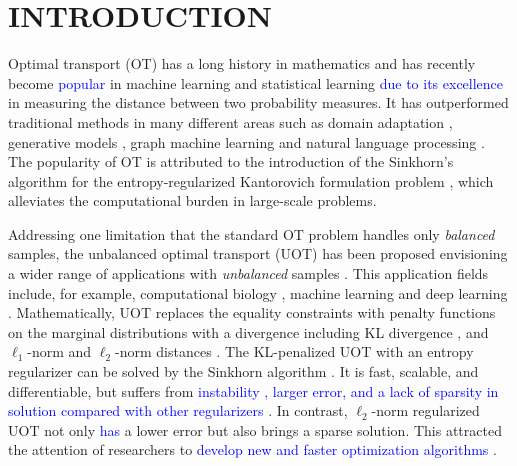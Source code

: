 \documentclass[twoside]{article}
\theoremstyle{plain}
\newcommand{\changeXS}[1]{\textcolor{blue}{#1}}
\begin{document}
\section{INTRODUCTION}
\label{sec:int}
Optimal transport (OT) has a long history in mathematics and has recently become \changeXS{popular} in machine learning and statistical learning \changeXS{due to its excellence }in measuring the distance between two probability measures. It has outperformed traditional methods in many different areas such as domain adaptation \citep{Courty_PAMI_2017}, generative models \citep{arjovsky2017wasserstein}, graph machine learning \citep{Maretic_NIPS_2019} and natural language processing \citep{Chen_ICLR_2019}. The popularity of OT is attributed to the introduction of the Sinkhorn's algorithm \citep{Sinkhorn_1974} for the entropy-regularized Kantorovich formulation problem \citep{Cuturi_NIPS_2013}, which alleviates the computational burden in large-scale problems.

Addressing one limitation that the standard OT problem handles only {\it balanced} samples, the unbalanced optimal transport (UOT) has been proposed envisioning a wider range of applications with {\it unbalanced} samples \citep{Caffarelli_AM_2010,chizat2017scaling}. This application fields include, for example, computational biology \citep{Schiebinger_CELL_2019}, machine learning \citep{Janati_AISTATS_2019} and deep learning \citep{Yang_ICLR_2019}. Mathematically, UOT replaces the equality constraints with penalty functions on the marginal distributions with a divergence including KL divergence \citep{Liero:2018wo}, and $\ell_1$-norm \citep{Caffarelli_AM_2010} and $\ell_2$-norm distances \citep{refId0}. The KL-penalized UOT with an entropy regularizer can be solved by the Sinkhorn algorithm \citep{UOTSinkhorn2020}. It is fast, scalable, and differentiable, but suffers from \changeXS{instability \citep{DBLP:journals/corr/Schmitzer16}, larger error, and a lack of sparsity in solution compared with other regularizers} \citep{Blondel_AISTATS_2018}. In contrast, $\ell_2$-norm regularized UOT not only \changeXS{has} a lower error but also brings a sparse solution. This attracted the attention of researchers to \changeXS{develop new and faster optimization algorithms} \citep{Blondel_AISTATS_2018, Nguyen_arXiv_2022}.
\end{document}
